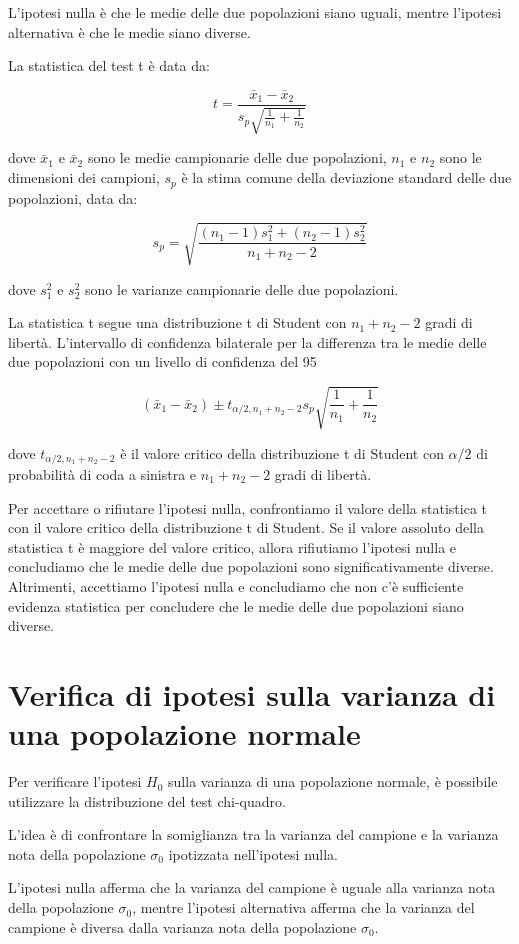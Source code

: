 L'ipotesi nulla è che le medie delle due popolazioni siano uguali, mentre l'ipotesi alternativa è che le medie siano diverse.

La statistica del test t è data da:

$$
t = \frac{\bar{x}_1 - \bar{x}_2}{s_{p}\sqrt{\frac{1}{n_1}+\frac{1}{n_2}}}
$$

dove $\bar{x}_1$ e $\bar{x}_2$ sono le medie campionarie delle due popolazioni, $n_1$ e $n_2$ sono le dimensioni dei campioni, $s_{p}$ è la stima comune della deviazione standard delle due popolazioni, data da:

$$
s_{p}=\sqrt{\frac{(n_1-1)s_1^2+(n_2-1)s_2^2}{n_1+n_2-2}}
$$

dove $s_1^2$ e $s_2^2$ sono le varianze campionarie delle due popolazioni.

La statistica t segue una distribuzione t di Student con $n_1+n_2-2$ gradi di libertà. L'intervallo di confidenza bilaterale per la differenza tra le medie delle due popolazioni con un livello di confidenza del 95%

$$
(\bar{x}_1 - \bar{x}_2) \pm t_{\alpha/2,n_1+n_2-2}s_p \sqrt{\frac{1}{n_1}+\frac{1}{n_2}}
$$

dove $t_{\alpha/2,n_1+n_2-2}$ è il valore critico della distribuzione t di Student con $\alpha/2$ di probabilità di coda a sinistra e $n_1+n_2-2$ gradi di libertà.

Per accettare o rifiutare l'ipotesi nulla, confrontiamo il valore della statistica t con il valore critico della distribuzione t di Student. Se il valore assoluto della statistica t è maggiore del valore critico, allora rifiutiamo l'ipotesi nulla e concludiamo che le medie delle due popolazioni sono significativamente diverse. Altrimenti, accettiamo l'ipotesi nulla e concludiamo che non c'è sufficiente evidenza statistica per concludere che le medie delle due popolazioni siano diverse.


\section{Verifica di ipotesi sulla varianza di una popolazione normale}
Per verificare l'ipotesi $H_0$ sulla varianza di una popolazione normale, è possibile utilizzare la distribuzione del test chi-quadro.

L'idea è di confrontare la somiglianza tra la varianza del campione e la varianza nota della popolazione $\sigma_0$ ipotizzata nell'ipotesi nulla.

L'ipotesi nulla afferma che la varianza del campione è uguale alla varianza nota della popolazione $\sigma_0$, mentre l'ipotesi alternativa afferma che la varianza del campione è diversa dalla varianza nota della popolazione $\sigma_0$.


